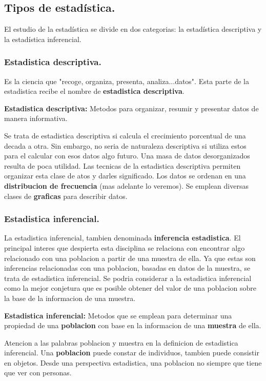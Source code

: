 \documentclass[]{article}
\begin{document}
\subsection{Tipos de estadística.}
El estudio de la estadística se divide en dos categorias: la estadística descriptiva y la estadística inferencial.
\subsubsection*{Estadistica descriptiva.}
Es la ciencia que "recoge, organiza, presenta, analiza...datos". Esta parte de la estadistica recibe el nombre de \textbf{estadistica descriptiva}.

\begin{flushleft}
\textbf{Estadistica descriptiva:} Metodos para organizar, resumir y presentar datos de manera informativa.
\end{flushleft}
Se trata de estadistica descriptiva si calcula el crecimiento porcentual de una decada a otra. Sin embargo, no seria de naturaleza descriptiva si utiliza estos para el calcular con esos datos algo futuro.
Una masa de datos desorganizados resulta de poca utilidad. Las tecnicas de la estadistica descriptiva permiten organizar esta clase de atos y darles significado. Los datos se ordenan en una \textbf{distribucion de frecuencia} (mas adelante lo veremos). Se emplean diversas clases de \textbf{graficas} para describir datos.

\subsubsection*{Estadistica inferencial.}
La estadistica inferencial, tambien denominada \textbf{inferencia estadistica}. El principal interes que despierta esta disciplina se relaciona con encontrar algo relacionado con una poblacion a partir de una muestra de ella. Ya que estas son inferencias relacionadas con una poblacion, basadas en datos de la muestra, se trata de estadistica inferencial. Se podria considerar a la estadistica inferencial como la mejor conjetura que es posible obtener del valor de una poblacion sobre la base de la informacion de una muestra.
\begin{flushleft}
	\textbf{Estadistica inferencial: }Metodos que se emplean para determinar una propiedad de una \textbf{poblacion} con base en la informacion de una \textbf{muestra} de ella.
\end{flushleft}
Atencion a las palabras poblacion y muestra en la definicion de estadistica inferencial. Una \textbf{poblacion} puede constar de individuos, tambien puede consistir en objetos. Desde una perspectiva estadistica, una poblacion no siempre que tiene que ver con personas.
\end{document}
